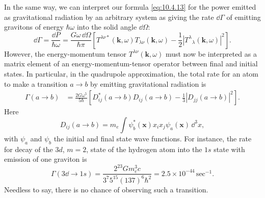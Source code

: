 In the same way, we can interpret our formula \eqref{eq:10.4.13} for the
power emitted as gravitational radiation by an arbitrary system as giving the
rate \(\dd\Gamma\) of emitting gravitons of energy \(\hbar\omega\) into the
solid angle \(\dd\Omega\):
\begin{equation}
  \dd\Gamma
  =
  \frac{\dd P}{\hbar\omega}
  =
  \frac{G\omega\,\dd\Omega}{\hbar\pi}
  \left[
    T^{\lambda\nu*}(\mathbf{k},\omega)
    T_{\lambda\nu}(\mathbf{k},\omega)
    -\frac12
    \left|T^\lambda{}_\lambda(\mathbf{k},\omega)\right|^2
  \right].
  \tag{10.8.5}\label{eq:10.8.5}
\end{equation}
However, the energy-momentum tensor \(T^{\lambda\nu}(\mathbf{k},\omega)\)
must now be interpreted as a matrix element of an energy-momentum-tensor
operator between final and initial states. In particular, in the quadrupole
approximation, the total rate for an atom to make a transition \(a\to b\)
by emitting gravitational radiation is
\begin{equation}
  \begin{split}
  \Gamma(a\to b)
  &=
  \frac{2G\omega^5}{5\hbar}
  \left[
    D_{ij}^*(a\to b)D_{ij}(a\to b)
    -\frac13\left|D_{jj}(a\to b)\right|^2
  \right].
  \end{split}
  \tag{10.8.6}\label{eq:10.8.6}
\end{equation}
Here
\begin{equation}
  D_{ij}(a\to b)
  =
  m_e\int
  \psi_b^*(\mathbf{x})x_i x_j\psi_a(\mathbf{x})\,\dd^3x,
  \tag{10.8.7}\label{eq:10.8.7}
\end{equation}
with \(\psi_a\) and \(\psi_b\) the initial and final state wave functions.
For instance, the rate for decay of the \(3d\), \(m=2\), state of the
hydrogen atom into the \(1s\) state with emission of one graviton is
\[
  \Gamma(3\dd\to1s)
  =
  \frac{2^{23}Gm_e^3c}
       {3^7 5^{15}(137)^6\hbar^2}
  =
  2.5\times10^{-44}\,\mathrm{sec^{-1}}.
\]
Needless to say, there is no chance of observing such a transition.

